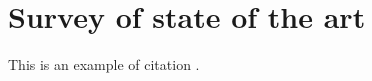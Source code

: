 \chapter{Survey of state of the art}

This is an example of citation \cite{Google}\cite{AndroidDevFragments}.